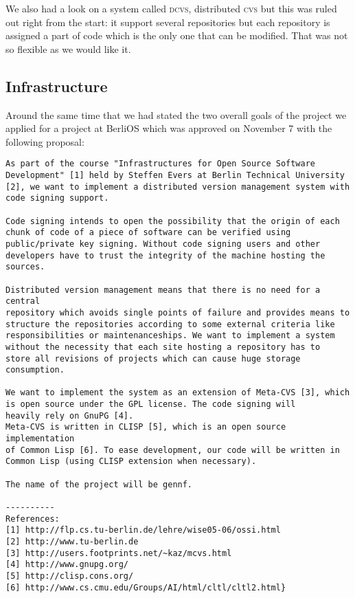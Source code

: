 \documentclass[fleqn, 10pt, a4paper]{report}
\begin{document}
We also had a look on a system called \textsc{dcvs}, distributed
\textsc{cvs} but this was ruled out right from the start:
it support several repositories but each repository is assigned a
part of code which is the only one that can be modified. That was
not so flexible as we would like it.

\subsection{Infrastructure}

Around the same time that we had stated the two overall goals of
the project we applied for a project at BerliOS which was approved on
November 7 with the following proposal:

\begin{verbatim}
As part of the course "Infrastructures for Open Source Software
Development" [1] held by Steffen Evers at Berlin Technical University
[2], we want to implement a distributed version management system with
code signing support.

Code signing intends to open the possibility that the origin of each
chunk of code of a piece of software can be verified using
public/private key signing. Without code signing users and other
developers have to trust the integrity of the machine hosting the
sources.

Distributed version management means that there is no need for a central
repository which avoids single points of failure and provides means to
structure the repositories according to some external criteria like
responsibilities or maintenanceships. We want to implement a system
without the necessity that each site hosting a repository has to
store all revisions of projects which can cause huge storage
consumption.

We want to implement the system as an extension of Meta-CVS [3], which
is open source under the GPL license. The code signing will 
heavily rely on GnuPG [4].
Meta-CVS is written in CLISP [5], which is an open source implementation
of Common Lisp [6]. To ease development, our code will be written in
Common Lisp (using CLISP extension when necessary).

The name of the project will be gennf.

----------
References:
[1] http://flp.cs.tu-berlin.de/lehre/wise05-06/ossi.html
[2] http://www.tu-berlin.de
[3] http://users.footprints.net/~kaz/mcvs.html
[4] http://www.gnupg.org/
[5] http://clisp.cons.org/
[6] http://www.cs.cmu.edu/Groups/AI/html/cltl/cltl2.html}
\end{verbatim}
\end{document}
